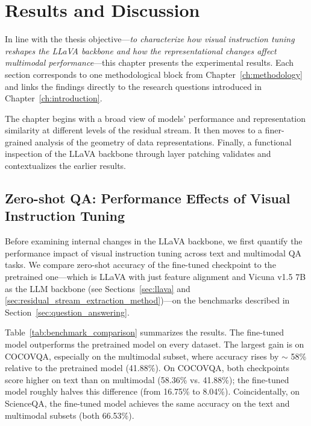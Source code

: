 \chapter{Results and Discussion}\label{ch:results_and_discussion}

In line with the thesis objective---\emph{to characterize how visual instruction tuning reshapes the LLaVA backbone and how the representational changes affect multimodal performance}---this chapter presents the experimental results. Each section corresponds to one methodological block from Chapter~\ref{ch:methodology} and links the findings directly to the research questions introduced in Chapter~\ref{ch:introduction}.

The chapter begins with a broad view of models' performance and representation similarity at different levels of the residual stream. It then moves to a finer-grained analysis of the geometry of data representations. Finally, a functional inspection of the LLaVA backbone through layer patching validates and contextualizes the earlier results.

\section{Zero-shot QA: Performance Effects of Visual Instruction Tuning}

Before examining internal changes in the LLaVA backbone, we first quantify the performance impact of visual instruction tuning across text and multimodal QA tasks. We compare zero-shot accuracy of the fine-tuned checkpoint to the pretrained one---which is LLaVA with just feature alignment and Vicuna v1.5 7B as the LLM backbone (see Sections~\ref{sec:llava} and \ref{sec:residual_stream_extraction_method})---on the benchmarks described in Section~\ref{sec:question_answering}.

Table~\ref{tab:benchmark_comparison} summarizes the results. The fine-tuned model outperforms the pretrained model on every dataset. The largest gain is on COCOVQA, especially on the multimodal subset, where accuracy rises by $\sim$ 58\% relative to the pretrained model (41.88\%). On COCOVQA, both checkpoints score higher on text than on multimodal (58.36\% vs. 41.88\%); the fine-tuned model roughly halves this difference (from 16.75\% to 8.04\%). Coincidentally, on ScienceQA, the fine-tuned model achieves the same accuracy on the text and multimodal subsets (both 66.53\%).

